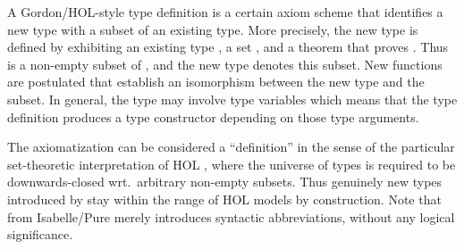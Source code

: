 \begin{isabellebody}
\begin{isamarkuptext}
\begin{description}
  \end{description}%
\end{isamarkuptext}%
\isamarkuptrue%
%
\isamarkuptrue%
%
\begin{isamarkuptext}%
A Gordon/HOL-style type definition is a certain axiom scheme
  that identifies a new type with a subset of an existing type.  More
  precisely, the new type is defined by exhibiting an existing type
  , a set , and a theorem that proves
  .  Thus  is a non-empty subset of , and the new type denotes this subset.  New functions are
  postulated that establish an isomorphism between the new type and
  the subset.  In general, the type  may involve type
  variables  which means that the type definition
  produces a type constructor  depending on
  those type arguments.

  The axiomatization can be considered a ``definition'' in the sense
  of the particular set-theoretic interpretation of HOL
  \cite{pitts93}, where the universe of types is required to be
  downwards-closed wrt.\ arbitrary non-empty subsets.  Thus genuinely
  new types introduced by \hyperlink{command.typedef}{\mbox{}} stay within the range
  of HOL models by construction.  Note that \hyperlink{command.type-synonym}{\mbox{}} from Isabelle/Pure merely introduces syntactic
  abbreviations, without any logical significance.
  

\end{isamarkuptext}
\end{isabellebody}

